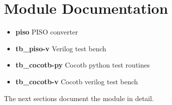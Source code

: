 \newpage

\section{Module Documentation} \label{Module Documentation}

\par

\begin{itemize}
\item \textbf{piso} PISO converter\\
\item \textbf{tb\_piso-v} Verilog test bench\\
\item \textbf{tb\_cocotb-py} Cocotb python test routines\\
\item \textbf{tb\_cocotb-v} Cocotb verilog test bench\\
\end{itemize}
The next sections document the module in detail.

